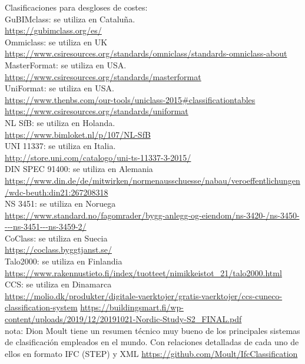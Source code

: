 \documentclass[spanish,12pt,a4paper,final,oneside]{book}
\begin{document}
\vspace{0.3cm}
Clasificaciones para desgloses de costes:
\\GuBIMclass: se utiliza en Cataluña.
\\ \url{https://gubimclass.org/es/}
\\Ommiclass: se utiliza en UK
\\ \url{https://www.csiresources.org/standards/omniclass/standards-omniclass-about}
\\MasterFormat: se utiliza en USA.
\\ \url{https://www.csiresources.org/standards/masterformat}
\\UniFormat: se utiliza en USA.
\\ \url{https://www.thenbs.com/our-tools/uniclass-2015#classificationtables}
\\ \url{https://www.csiresources.org/standards/uniformat}
\\NL SfB:  se utiliza en Holanda.
\\ \url{https://www.bimloket.nl/p/107/NL-SfB}
\\UNI 11337: se utiliza en Italia.
\\ \url{http://store.uni.com/catalogo/uni-ts-11337-3-2015/}
\\DIN SPEC 91400: se utiliza en Alemania 
\\ \url{https://www.din.de/de/mitwirken/normenausschuesse/nabau/veroeffentlichungen/wdc-beuth:din21:267208318}
\\NS 3451: se utiliza en Noruega
\\ \url{https://www.standard.no/fagomrader/bygg-anlegg-og-eiendom/ns-3420-/ns-3450----ns-3451---ns-3459-2/}
\\CoClass: se utiliza en Suecia
\\ \url{https://coclass.byggtjanst.se/}
\\Talo2000: se utiliza en Finlandia
\\ \url{https://www.rakennustieto.fi/index/tuotteet/nimikkeistot_21/talo2000.html}
\\CCS: se utiliza en Dinamarca
\\ \url{https://molio.dk/produkter/digitale-vaerktojer/gratis-vaerktojer/ccs-cuneco-classification-system}
\url{https://buildingsmart.fi/wp-content/uploads/2019/12/20191021-Nordic-Study-S2_FINAL.pdf}
\\nota: Dion Moult tiene un resumen técnico muy bueno de los principales sistemas de clasificación empleados en el mundo. Con relaciones detalladas de cada uno de ellos en formato IFC (STEP) y XML  \url{https://github.com/Moult/IfcClassification}
\end{document}
